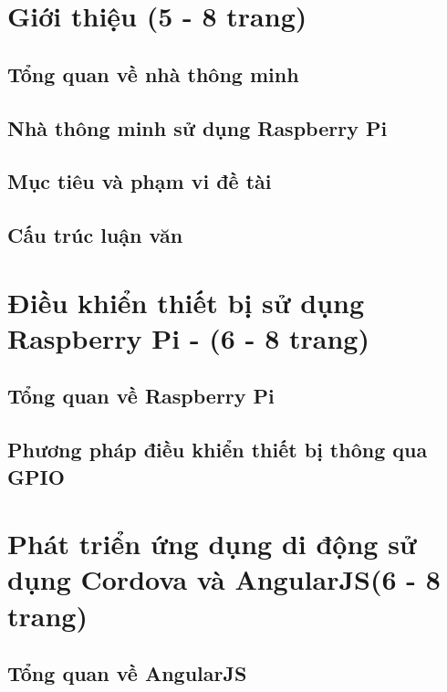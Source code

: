 \documentclass[11pt,a4paper,oneside]{book}
\begin{document}
\begingroup
\let\cleardoublepage\clearpage
\tableofcontents 
 
\endgroup



\chapter{Giới thiệu (5 - 8 trang)}
\newpage
\section{Tổng quan về nhà thông minh}
\newpage
\section{Nhà thông minh sử dụng Raspberry Pi}
\newpage
\section{Mục tiêu và phạm vi đề tài}
\newpage
\section{Cấu trúc luận văn}

\chapter{Điều khiển thiết bị sử dụng Raspberry Pi - (6 - 8 trang)}
\newpage
\section{Tổng quan về Raspberry Pi}
\newpage
\section{Phương pháp điều khiển thiết bị thông qua GPIO}

\chapter{Phát triển ứng dụng di động sử dụng Cordova và AngularJS(6 - 8 trang)}
\newpage
\section{Tổng quan về AngularJS}
\newpage
\end{document}
